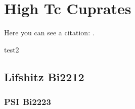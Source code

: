 \chapter{High Tc Cuprates}
Here you can see a citation: \cite{atc13}.

test2 \cite{atc13}


\lipsum[7]

\section{Lifshitz Bi2212}

\lipsum[3]

\subsection{PSI Bi2223}

\lipsum[3]
